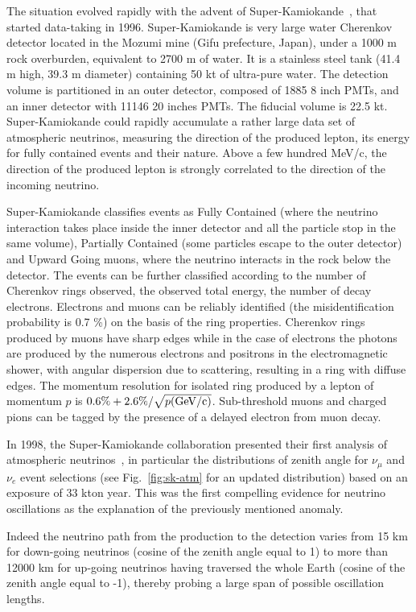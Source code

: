 The situation evolved rapidly with the advent of Super-Kamiokande~\cite{sknim}, that started data-taking in 1996. Super-Kamiokande is very large water Cherenkov detector located in the Mozumi mine (Gifu prefecture, Japan), under a 1000 m rock overburden, equivalent to 2700 m of water. It is a stainless steel tank (41.4 m high, 39.3 m diameter) containing 50 kt of ultra-pure water. The detection volume is partitioned in an outer detector, composed of 1885 8 inch PMTs, and an inner detector with 11146 20 inches PMTs. The fiducial volume is 22.5 kt. Super-Kamiokande could rapidly accumulate a rather large data set of atmospheric neutrinos, measuring the direction of the produced lepton, its energy for fully contained events and their nature. Above a few hundred MeV/c, the direction of the produced lepton is strongly correlated to the direction of the incoming neutrino.

Super-Kamiokande classifies events as Fully Contained (where the neutrino interaction takes place inside the inner detector and all the particle stop in the same volume), Partially Contained (some particles escape to the outer detector) and Upward Going muons, where the neutrino interacts in the rock below the detector. The events can be further classified according to the number of Cherenkov rings observed, the observed total energy, the number of decay electrons. Electrons and muons can be reliably identified (the misidentification probability is 0.7 \%) on the basis of the ring properties. Cherenkov rings produced by muons have sharp edges while in the case of electrons the photons are produced by the numerous electrons and positrons in the electromagnetic shower, with angular dispersion due to scattering, resulting in a ring with diffuse edges. The momentum resolution for isolated ring produced by a lepton of momentum $p$ is $0.6\% +2.6\%/\sqrt{p ({\rm GeV/c})}$. Sub-threshold muons and charged pions can be tagged by the presence of a delayed electron from muon decay.

In 1998, the Super-Kamiokande collaboration presented their first analysis of atmospheric neutrinos~\cite{Fukuda:1998mi}, in particular the distributions of zenith angle for $ \nu_\mu$ and $\nu_e$ event selections (see Fig.~\ref{fig:sk-atm} for an updated distribution) based on an exposure of 33 kton year. This was the first compelling evidence for neutrino oscillations as the explanation of the previously mentioned anomaly.  

Indeed the neutrino path from the production to the detection varies from 15 km for down-going neutrinos (cosine of the zenith angle equal to 1) to more than 12000 km for up-going neutrinos having traversed the whole Earth (cosine of the zenith angle equal to -1), thereby probing a large span of possible oscillation lengths. 


